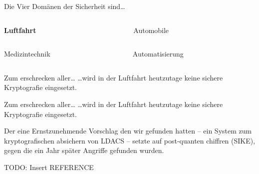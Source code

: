 

\begin{frame}{Die Vier Domänen der Sicherheit sind…}
  \begin{columns}[c]
    \begin{column}{.5\linewidth}
      \textbf{Luftfahrt}
    \end{column}
    \begin{column}{.5\linewidth}
      Automobile
    \end{column}
  \end{columns}
  \vfill
  \begin{columns}[c]
    \begin{column}{.5\linewidth}
      Medizintechnik
    \end{column}
    \begin{column}{.5\linewidth}
      Automatisierung
    \end{column}
  \end{columns}
\end{frame}


\begin{frame}[c]{Zum erschrecken aller…}
  \vspace{15em}
  \footnotesize
  …wird in der Luftfahrt heutzutage keine sichere Kryptografie eingesetzt. 
\end{frame}

\begin{frame}[c]{Zum erschrecken aller…}
  \vspace{10em}
  \footnotesize
  …wird in der Luftfahrt heutzutage keine sichere Kryptografie eingesetzt. 

  \vspace{1em}
  Der eine Ernstzunehmende Vorschlag den wir gefunden hatten -- ein System zum kryptografischen absichern von LDACS --
  setzte auf post-quanten chiffren (SIKE), gegen die ein Jahr später Angriffe gefunden wurden.

  \vspace{1em}
  TODO: Insert REFERENCE
\end{frame}

